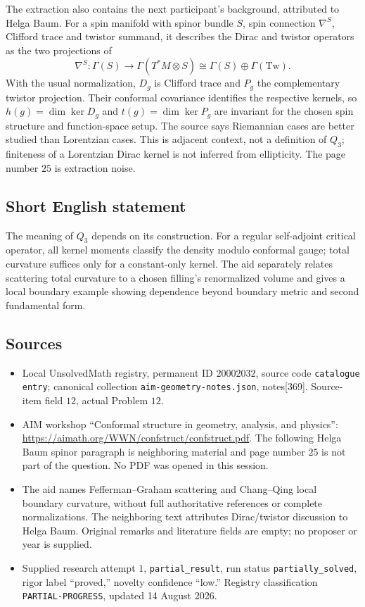 \documentclass[11pt]{article}
\begin{document}
The extraction also contains the next participant's background, attributed to Helga Baum. For a spin manifold with spinor bundle \(S\), spin connection \(\nabla^S\), Clifford trace and twistor summand, it describes the Dirac and twistor operators as the two projections of
\[
 \nabla^S:\Gamma(S)\to\Gamma(T^*M\otimes S)
       \cong\Gamma(S)\oplus\Gamma(\mathrm{Tw}).
\]
With the usual normalization, \(D_g\) is Clifford trace and \(P_g\) the complementary twistor projection. Their conformal covariance identifies the respective kernels, so \(h(g)=\dim\ker D_g\) and \(t(g)=\dim\ker P_g\) are invariant for the chosen spin structure and function-space setup. The source says Riemannian cases are better studied than Lorentzian cases. This is adjacent context, not a definition of \(Q_3\); finiteness of a Lorentzian Dirac kernel is not inferred from ellipticity. The page number \(25\) is extraction noise.
\subsection{Short English statement}
The meaning of \(Q_3\) depends on its construction. For a regular self-adjoint critical operator, all kernel moments classify the density modulo conformal gauge; total curvature suffices only for a constant-only kernel. The aid separately relates scattering total curvature to a chosen filling's renormalized volume and gives a local boundary example showing dependence beyond boundary metric and second fundamental form.
\subsection{Sources}
\begin{itemize}
\item Local UnsolvedMath registry, permanent ID \(20002032\), source code \texttt{catalogue entry}; canonical collection \texttt{aim-geometry-notes.json}, notes[369]. Source-item field \(12\), actual Problem \(12\).
\item AIM workshop ``Conformal structure in geometry, analysis, and physics'': \url{https://aimath.org/WWN/confstruct/confstruct.pdf}. The following Helga Baum spinor paragraph is neighboring material and page number \(25\) is not part of the question. No PDF was opened in this session.
\item The aid names Fefferman--Graham scattering and Chang--Qing local boundary curvature, without full authoritative references or complete normalizations. The neighboring text attributes Dirac/twistor discussion to Helga Baum. Original remarks and literature fields are empty; no proposer or year is supplied.
\item Supplied research attempt \(1\), \texttt{partial\_result}, run status \texttt{partially\_solved}, rigor label ``proved,'' novelty confidence ``low.'' Registry classification \texttt{PARTIAL-PROGRESS}, updated 14 August 2026.
\end{itemize}
\end{document}
